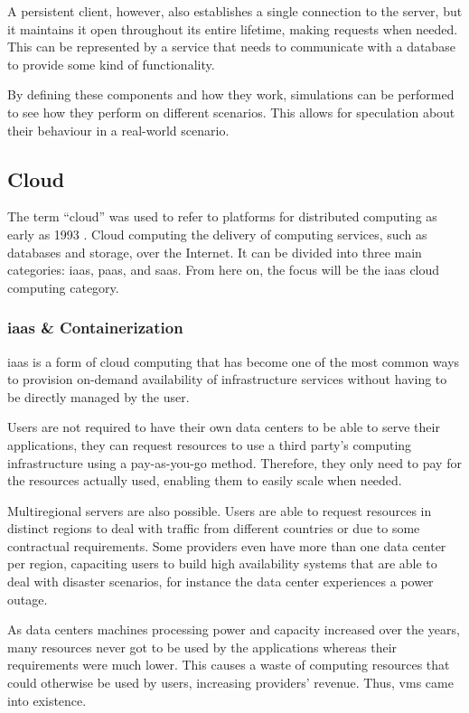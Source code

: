 A persistent client, however, also establishes a single connection to the server, but it maintains it open throughout its entire lifetime, making requests when needed. This can be represented by a service that needs to communicate with a database to provide some kind of functionality.

By defining these components and how they work, simulations can be performed to see how they perform on different scenarios. This allows for speculation about their behaviour in a real-world scenario.

\subsection{Cloud}

The term “cloud” was used to refer to platforms for distributed computing as early as 1993 \cite{what_is_cloud}. Cloud computing the delivery of computing services, such as databases and storage, over the Internet. It can be divided into three main categories: \gls{iaas}, \gls{paas}, and \gls{saas}. From here on, the focus will be the \gls{iaas} cloud computing category.

\subsubsection{\gls{iaas} \& Containerization}

\gls{iaas} is a form of cloud computing that has become one of the most common ways to provision on-demand availability of infrastructure services without having to be directly managed by the user.

Users are not required to have their own data centers to be able to serve their applications, they can request resources to use a third party’s computing infrastructure using a pay-as-you-go method. Therefore, they only need to pay for the resources actually used, enabling them to easily scale when needed.

Multiregional servers are also possible. Users are able to request resources in distinct regions to deal with traffic from different countries or due to some contractual requirements. Some providers even have more than one data center per region, capaciting users to build high availability systems that are able to deal with disaster scenarios, for instance the data center experiences a power outage.

As data centers machines processing power and capacity increased over the years, many resources never got to be used by the applications whereas their requirements were much lower. This causes a waste of computing resources that could otherwise be used by users, increasing providers’ revenue. Thus, \glspl{vm} came into existence. 

